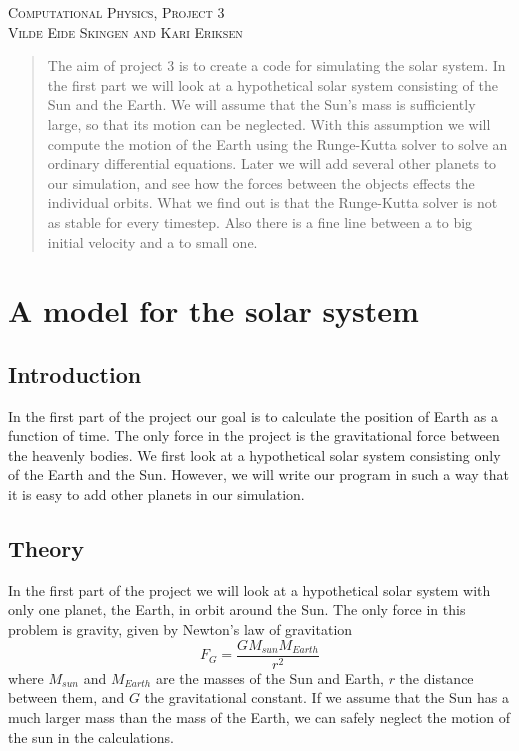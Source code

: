 \documentclass[a4paper,12pt, english]{article}
\begin{document}
\begin{titlepage}
\begin{center}
\textsc{\Large Computational Physics, Project 3}\\[0.5cm]
\textsc{Vilde Eide Skingen and Kari Eriksen}\\[0.5cm]

\end{center}
\end{titlepage}

\begin{abstract}
The aim of project 3 is to create a code for simulating the solar system. In the first part we will look at a hypothetical solar system consisting of the Sun and the Earth. We will assume that the Sun's mass is sufficiently large, so that its motion can be neglected. With this assumption we will compute the motion of the Earth using the Runge-Kutta solver to solve an ordinary differential equations. Later we will add several other planets to our simulation, and see how the forces between the objects effects the individual orbits.
What we find out is that the Runge-Kutta solver is not as stable for every timestep. Also there is a fine line between a to big initial velocity and a to small one. 

\end{abstract}

\section*{A model for the solar system}

\subsection*{Introduction}
In the first part of the project our goal is to calculate the position of Earth as a function of time. The only force in the project is the gravitational force between the heavenly bodies. We first look at a hypothetical solar system consisting only of the Earth and the Sun. However, we will write our program in such a way that it is easy to add other planets in our simulation. 

\subsection*{Theory}

In the first part of the project we will look at a hypothetical solar system with only one planet, the Earth, in orbit around the Sun. The only force in this problem is gravity, given by Newton's law of gravitation $$ F_G = \frac{GM_{sun}M_{Earth}}{r^2} $$
where $M_{sun}$ and $M_{Earth}$ are the masses of the Sun and Earth, $r$ the distance between them, and $G$ the gravitational constant. If we assume that the Sun has a much larger mass than the mass of the Earth, we can safely neglect the motion of the sun in the calculations. 
\end{document}
